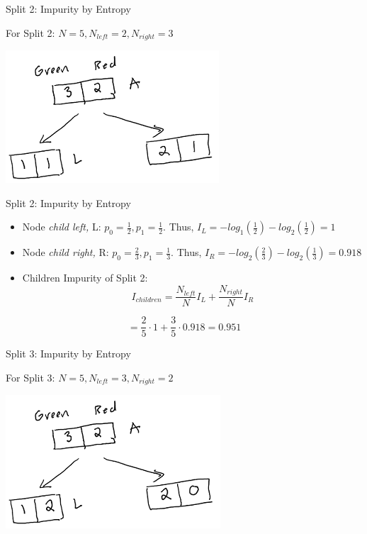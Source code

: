 \documentclass[
  ignorenonframetext,
]{beamer}
\begin{document}
\begin{frame}{Split 2: Impurity by Entropy}
\protect\hypertarget{split-2-impurity-by-entropy}{}

For Split 2: \(N = 5, N_{left} =2, N_{right} = 3\)

\includegraphics{images2/im3.png}

\end{frame}

\begin{frame}{Split 2: Impurity by Entropy}
\protect\hypertarget{split-2-impurity-by-entropy-1}{}

\begin{itemize}
\item
  Node \emph{child left,} L: \(p_0 = \frac{1}{2}, p_1 = \frac{1}{2}\).
  Thus, \(I_{L} = - log_1(\frac{1}{2})-log_2(\frac{1}{2})=1\)
\item
  Node \emph{child right,} R: \(p_0 = \frac{2}{3}, p_1 = \frac{1}{3}\).
  Thus, \(I_{R} = -log_2(\frac{2}{3}) -log_2(\frac{1}{3}) = 0.918\)
\item
  Children Impurity of Split 2: \[
  I_{children} =  \frac{N_{left}}{N}I_{L}+\frac{N_{right}}{N}I_{R}
  \]
\end{itemize}

\[ = \frac{2}{5} \cdot 1 + \frac{3}{5} \cdot 0.918 = 0.951\]

\end{frame}

\begin{frame}{Split 3: Impurity by Entropy}
\protect\hypertarget{split-3-impurity-by-entropy}{}

For Split 3: \(N = 5, N_{left} =3, N_{right} = 2\)

\includegraphics{images2/im2.png}

\end{frame}
\end{document}
